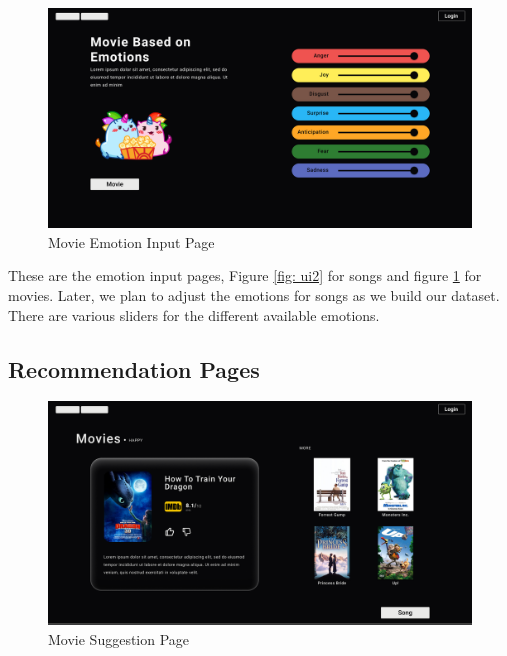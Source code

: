 \begin{figure}[H]
\centering
\includegraphics[width=\textwidth]{imgs/ui3.png}
\caption{Movie Emotion Input Page}
\label{fig: ui3}
\end{figure}

These are the emotion input pages, Figure \ref{fig: ui2} for songs and figure \ref{fig: ui3} for movies. Later, we plan to adjust the emotions for songs as we build our dataset. There are various sliders for the different available emotions.

\subsection{Recommendation Pages}
\begin{figure}[H]
\centering
\includegraphics[width=\textwidth]{imgs/ui4.png}
\caption{Movie Suggestion Page}
\label{fig: ui4}
\end{figure}

